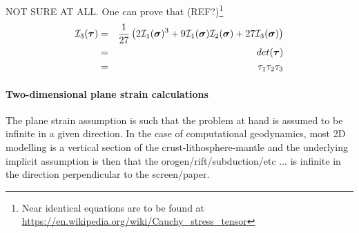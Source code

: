 \vspace{1cm}

{\color{gray} 
NOT SURE AT ALL. One can prove that (REF?)\footnote{Near identical equations are to be found at 
\url{https://en.wikipedia.org/wiki/Cauchy_stress_tensor}} 
\begin{eqnarray}
{\cal I}_3({\bm \tau}) 
&=& \frac{1}{27} \left( 2 {\cal I}_1({\bm \sigma})^3 + 
9 {\cal I}_1({\bm \sigma}) {\cal I}_2({\bm \sigma}) 
+27 {\cal I}_3({\bm \sigma})   \right) \nonumber\\
&=& det ({\bm\tau}) \nonumber\\
&=& \tau_1 \tau_2\tau_3 \nonumber\\
\end{eqnarray}
}

\paragraph{Two-dimensional plane strain calculations} 

The plane strain assumption is such that the problem at hand is assumed to be infinite in a given direction. 
In the case of computational geodynamics, most 2D modelling is a vertical section of the crust-lithosphere-mantle
and the underlying implicit assumption is then that the orogen/rift/subduction/etc ... is infinite in the 
direction perpendicular to the screen/paper. 

